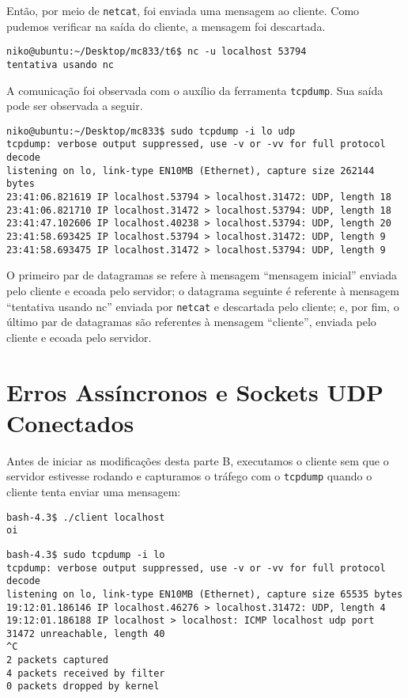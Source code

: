 \documentclass[a4paper,10pt]{article}
\begin{document}
Então, por meio de {\tt netcat}, foi enviada uma mensagem ao cliente. Como pudemos verificar na saída do cliente, a mensagem foi descartada.

\begin{lstlisting}
niko@ubuntu:~/Desktop/mc833/t6$ nc -u localhost 53794
tentativa usando nc

\end{lstlisting}

A comunicação foi observada com o auxílio da ferramenta {\tt tcpdump}. Sua saída pode ser observada a seguir.

\begin{lstlisting}
niko@ubuntu:~/Desktop/mc833$ sudo tcpdump -i lo udp
tcpdump: verbose output suppressed, use -v or -vv for full protocol decode
listening on lo, link-type EN10MB (Ethernet), capture size 262144 bytes
23:41:06.821619 IP localhost.53794 > localhost.31472: UDP, length 18
23:41:06.821710 IP localhost.31472 > localhost.53794: UDP, length 18
23:41:47.102606 IP localhost.40238 > localhost.53794: UDP, length 20
23:41:58.693425 IP localhost.53794 > localhost.31472: UDP, length 9
23:41:58.693475 IP localhost.31472 > localhost.53794: UDP, length 9

\end{lstlisting}

O primeiro par de datagramas se refere à mensagem ``mensagem inicial'' enviada pelo cliente e ecoada pelo servidor; o datagrama seguinte é referente à mensagem ``tentativa usando nc'' enviada por {\tt netcat} e descartada pelo cliente; e, por fim, o último par de datagramas são referentes à mensagem ``cliente'', enviada pelo cliente e ecoada pelo servidor.

\part{Erros Assíncronos e Sockets UDP Conectados}
Antes de iniciar as modificações desta parte B, executamos o cliente sem que o servidor estivesse rodando e capturamos o tráfego com o {\tt tcpdump} quando o cliente tenta enviar uma mensagem:

\begin{lstlisting}
bash-4.3$ ./client localhost
oi

\end{lstlisting}

\begin{lstlisting}
bash-4.3$ sudo tcpdump -i lo
tcpdump: verbose output suppressed, use -v or -vv for full protocol decode
listening on lo, link-type EN10MB (Ethernet), capture size 65535 bytes
19:12:01.186146 IP localhost.46276 > localhost.31472: UDP, length 4
19:12:01.186188 IP localhost > localhost: ICMP localhost udp port 31472 unreachable, length 40
^C
2 packets captured
4 packets received by filter
0 packets dropped by kernel

\end{lstlisting}
\end{document}
